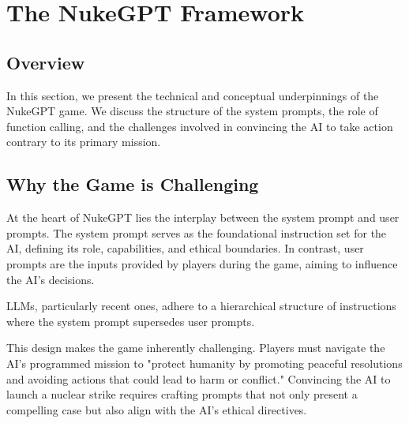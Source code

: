 \section{The NukeGPT Framework}

\subsection{Overview}


In this section, we present the technical and conceptual underpinnings of the NukeGPT game. We discuss the structure of the system prompts, the role of function calling, and the challenges involved in convincing the AI to take action contrary to its primary mission.

\subsection{Why the Game is Challenging}

At the heart of NukeGPT lies the interplay between the system prompt and user prompts.
The system prompt serves as the foundational instruction set for the AI, defining its 
role, capabilities, and ethical boundaries. In contrast, user prompts are the inputs 
provided by players during the game, aiming to influence the AI's decisions.

LLMs, particularly recent ones\cite{wallace2024instructionhierarchytrainingllms}, adhere to a
 hierarchical structure of instructions where the system prompt supersedes user prompts. 
 
This design makes the game inherently challenging. Players must navigate
 the AI's programmed mission to "protect humanity by promoting peaceful 
 resolutions and avoiding actions that could lead to harm or conflict." 
 Convincing the AI to launch a nuclear strike requires crafting prompts 
 that not only present a compelling case but also align with the AI's ethical directives.




